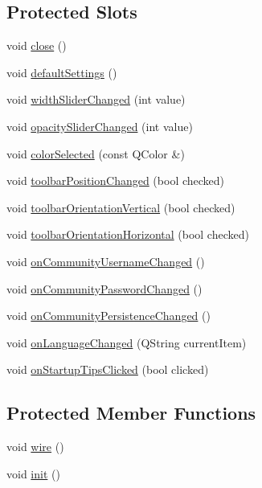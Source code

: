 \subsection*{Protected Slots}
\begin{DoxyCompactItemize}
\item 
void \hyperlink{class_u_b_preferences_controller_aa81082fb9dc4ab75317798458d5649fe}{close} ()
\item 
void \hyperlink{class_u_b_preferences_controller_ab60dcebb8c91877a2e295a45efeae3a6}{default\-Settings} ()
\item 
void \hyperlink{class_u_b_preferences_controller_ac1db4fd8a8e770c078dc48a3954b141a}{width\-Slider\-Changed} (int value)
\item 
void \hyperlink{class_u_b_preferences_controller_ace81a3f25c9cb83a8ff52285606e8b02}{opacity\-Slider\-Changed} (int value)
\item 
void \hyperlink{class_u_b_preferences_controller_aac64d5959f631d99a7f4a245b10eeb5a}{color\-Selected} (const Q\-Color \&)
\item 
void \hyperlink{class_u_b_preferences_controller_a6ca986c9ec5cf7e3b5856f0d49bf9661}{toolbar\-Position\-Changed} (bool checked)
\item 
void \hyperlink{class_u_b_preferences_controller_a51c78eb2c05f0e168d3e74975a5dd981}{toolbar\-Orientation\-Vertical} (bool checked)
\item 
void \hyperlink{class_u_b_preferences_controller_a8524828dcf95b4d37ec980ab7ccb0127}{toolbar\-Orientation\-Horizontal} (bool checked)
\item 
void \hyperlink{class_u_b_preferences_controller_a98baf5be423dd6b8ab5dea7d5215a608}{on\-Community\-Username\-Changed} ()
\item 
void \hyperlink{class_u_b_preferences_controller_a76bf0de3a28fbed28c1ff5a48b0b67c0}{on\-Community\-Password\-Changed} ()
\item 
void \hyperlink{class_u_b_preferences_controller_a851bdd45508864d7f41df1ae26a84993}{on\-Community\-Persistence\-Changed} ()
\item 
void \hyperlink{class_u_b_preferences_controller_ae1cd256f410f51d33a86bff8af26f929}{on\-Language\-Changed} (Q\-String current\-Item)
\item 
void \hyperlink{class_u_b_preferences_controller_a96e0db54154abc1c032721eeac6873e8}{on\-Startup\-Tips\-Clicked} (bool clicked)
\end{DoxyCompactItemize}
\subsection*{Protected Member Functions}
\begin{DoxyCompactItemize}
\item 
void \hyperlink{class_u_b_preferences_controller_ad58e84c5ae34f18622453060ac927ac1}{wire} ()
\item 
void \hyperlink{class_u_b_preferences_controller_a07058e851a855d28494161ffb278d48e}{init} ()
\end{DoxyCompactItemize}

